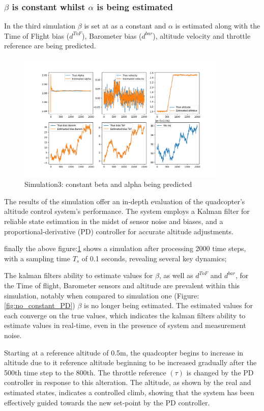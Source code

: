 \documentclass{article}
\begin{document}
\subsubsection*{\(\beta\) is constant whilst \(\alpha\) is being estimated}
In the third simulation \(\beta\) is set at as a constant and \(\alpha\) is estimated along with the Time of Flight bias (\(d^{ToF}\)), Barometer bias (\(d^{bar}\)), altitude velocity and throttle reference are being predicted.
\begin{figure}[H]
  \centering
  \includegraphics[width=0.9\textwidth]{Pictures/b_constant_PD.png}
  \caption{Simulation3: constant beta and alpha being predicted}
  \label{fig:b_constant_PD}
\end{figure}
The results of the simulation offer an in-depth evaluation of the quadcopter's altitude control system's performance. The system employs a Kalman filter for reliable state estimation in the midst of sensor noise and biases, and a proportional-derivative (PD) controller for accurate altitude adjustments.

finally the above figure:\ref{fig:b_constant_PD} shows a simulation after processing 2000 time steps, with a sampling time \(T_s\) of 0.1 seconds, revealing several key dynamics;

The kalman filters ability to estimate values for \(\beta\), as well as \(d^{ToF}\) and \(d^{bar}\), for the Time of flight, Barometer sensors and altitude are prevalent within this simulation, notably when compared to simulation one (Figure:\ref{fig:no_constant_PD}) \(\beta\) is no longer being estimated. The estimated values for each 
converge on the true values, which indicates the kalman filters ability to estimate values in real-time, even in the presence of system and measurement noise.

Starting at a reference altitude of 0.5m, the quadcopter begins to increase in altitude due to it reference altitude beginning to be increased gradually after the 500th time step to the 800th. The throttle reference \((\tau)\) is changed by the PD controller in response to this alteration. The altitude, as shown by the real 
and estimated states, indicates a controlled climb, showing that the system has been effectively guided towards the new set-point by the PD controller.
\end{document}
